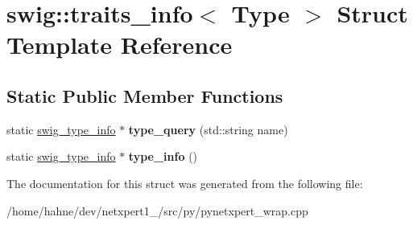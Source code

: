 \hypertarget{structswig_1_1traits__info}{}\section{swig\+:\+:traits\+\_\+info$<$ Type $>$ Struct Template Reference}
\label{structswig_1_1traits__info}
\subsection*{Static Public Member Functions}
\begin{DoxyCompactItemize}
\item 
static \hyperlink{structswig__type__info}{swig\+\_\+type\+\_\+info} $\ast$ {\bfseries type\+\_\+query} (std\+::string name)\hypertarget{structswig_1_1traits__info_a2616554081419ccfe7f4396f1b8656f9}{}\label{structswig_1_1traits__info_a2616554081419ccfe7f4396f1b8656f9}

\item 
static \hyperlink{structswig__type__info}{swig\+\_\+type\+\_\+info} $\ast$ {\bfseries type\+\_\+info} ()\hypertarget{structswig_1_1traits__info_acfa11e9ee91b0e0319bf8a3707f71084}{}\label{structswig_1_1traits__info_acfa11e9ee91b0e0319bf8a3707f71084}

\end{DoxyCompactItemize}


The documentation for this struct was generated from the following file\+:\begin{DoxyCompactItemize}
\item 
/home/hahne/dev/netxpert1\+\_/src/py/pynetxpert\+\_\+wrap.\+cpp\end{DoxyCompactItemize}
